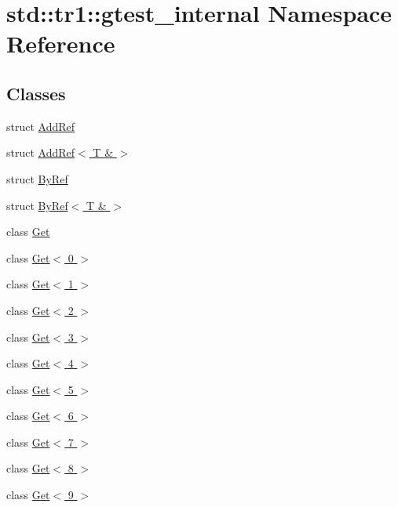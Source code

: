 \hypertarget{namespacestd_1_1tr1_1_1gtest__internal}{}\section{std\+:\+:tr1\+:\+:gtest\+\_\+internal Namespace Reference}
\label{namespacestd_1_1tr1_1_1gtest__internal}
\subsection*{Classes}
\begin{DoxyCompactItemize}
\item 
struct \hyperlink{structstd_1_1tr1_1_1gtest__internal_1_1AddRef}{Add\+Ref}
\item 
struct \hyperlink{structstd_1_1tr1_1_1gtest__internal_1_1AddRef_3_01T_01_6_01_4}{Add\+Ref$<$ T \& $>$}
\item 
struct \hyperlink{structstd_1_1tr1_1_1gtest__internal_1_1ByRef}{By\+Ref}
\item 
struct \hyperlink{structstd_1_1tr1_1_1gtest__internal_1_1ByRef_3_01T_01_6_01_4}{By\+Ref$<$ T \& $>$}
\item 
class \hyperlink{classstd_1_1tr1_1_1gtest__internal_1_1Get}{Get}
\item 
class \hyperlink{classstd_1_1tr1_1_1gtest__internal_1_1Get_3_010_01_4}{Get$<$ 0 $>$}
\item 
class \hyperlink{classstd_1_1tr1_1_1gtest__internal_1_1Get_3_011_01_4}{Get$<$ 1 $>$}
\item 
class \hyperlink{classstd_1_1tr1_1_1gtest__internal_1_1Get_3_012_01_4}{Get$<$ 2 $>$}
\item 
class \hyperlink{classstd_1_1tr1_1_1gtest__internal_1_1Get_3_013_01_4}{Get$<$ 3 $>$}
\item 
class \hyperlink{classstd_1_1tr1_1_1gtest__internal_1_1Get_3_014_01_4}{Get$<$ 4 $>$}
\item 
class \hyperlink{classstd_1_1tr1_1_1gtest__internal_1_1Get_3_015_01_4}{Get$<$ 5 $>$}
\item 
class \hyperlink{classstd_1_1tr1_1_1gtest__internal_1_1Get_3_016_01_4}{Get$<$ 6 $>$}
\item 
class \hyperlink{classstd_1_1tr1_1_1gtest__internal_1_1Get_3_017_01_4}{Get$<$ 7 $>$}
\item 
class \hyperlink{classstd_1_1tr1_1_1gtest__internal_1_1Get_3_018_01_4}{Get$<$ 8 $>$}
\item 
class \hyperlink{classstd_1_1tr1_1_1gtest__internal_1_1Get_3_019_01_4}{Get$<$ 9 $>$}

\end{DoxyCompactItemize}
